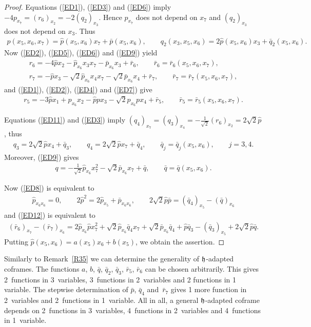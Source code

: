 \documentclass[11pt]{article}
\numberwithin{equation}{section}
\newcommand\fh{{\frak h}}
\begin{document}
\begin{proof}
Equations (\ref{ED1}), (\ref{ED3}) and (\ref{ED6}) imply $-4 p_{x_7}=(r_6)_{x_2}=-2(q_2)_{x_3}$. Hence $p_{x_7}$ does not depend on $x_7$ and $(q_2)_{x_3}$ does not depend on $x_3$. Thus
\begin{gather*}p(x_5,x_6,x_7)=\hat p(x_5,x_6)x_7+\bar p(x_5,x_6), \qquad q_2(x_3,x_5,x_6)=2\hat p(x_5,x_6)x_3 +\bar q_2(x_5,x_6).\end{gather*}
Now (\ref{ED2}), (\ref{ED5}), (\ref{ED6}) and (\ref{ED9}) yield
\begin{gather*}
r_6 = -4 \hat px_2-\hat p_{x_6} x_3 x_7 -\bar p_{x_6} x_3 +\bar r_6,\qquad \bar r_6=\bar r_6(x_5,x_6,x_7),\\
r_7 = -\hat p x_3-\sqrt 2 \hat p_{x_6} x_4x_7-\sqrt 2\bar p_{x_6} x_4 +\bar r_7, \qquad \bar r_7=\bar r_7(x_5,x_6,x_7),
\end{gather*}
and (\ref{ED1}), (\ref{ED2}), (\ref{ED4}) and (\ref{ED7}) give
\begin{gather*} r_5= -3\hat p x_1+p_{x_6}x_2-\hat ppx_3-\sqrt2 p_{x_6}px_4+\bar r_5,\qquad \bar r_5=\bar r_5(x_5,x_6,x_7).\end{gather*}

Equations (\ref{ED11}) and (\ref{ED3}) imply
 $(q_4)_{x_7}=(q_3)_{x_4}=-\frac 1{\sqrt2} (r_6)_{x_2}=2\sqrt 2 \hat p$, thus
\begin{gather*} q_3=2\sqrt 2 \hat px_4+\bar q_3,\qquad q_4=2\sqrt 2 \hat p x_7 +\bar q_4, \qquad \bar q_j=\bar q_j(x_5,x_6),\qquad j=3,4 .\end{gather*}
Moreover, (\ref{ED9}) gives
\begin{gather*}q= -\tfrac1{\sqrt 2} \hat p_{x_6} x_7^2-\sqrt 2 \bar p_{x_6}x_7+\bar q,\qquad \bar q=\bar q(x_5,x_6). \end{gather*}

Now (\ref{ED8}) is equivalent to
\begin{gather*}\hat p_{x_6 x_6}=0,\qquad 2\hat p^2=2\hat p_{x_5}+\bar p_{x_6 x_6}, \qquad
2\sqrt 2\hat p\bar p=(\bar q_4)_{x_5}-(\bar q)_{x_6}\end{gather*}
and (\ref{ED12}) is equivalent to
\begin{gather*}(\bar r_6)_{x_7}-(\bar r_7)_{x_6}=2\hat p_{x_6}\hat px_7^2+\sqrt2\hat p_{x_6}\bar q_4x_7+\sqrt2 \bar p_{x_6} \bar q_4+\hat p\bar q_3-(\bar q_3)_{x_5}+2\sqrt2 \hat p\bar q.\end{gather*}
Putting $\hat p(x_5,x_6)=a(x_5)x_6+b(x_5)$, we obtain the assertion.
\end{proof}
\begin{Remark}\label{R38} Similarly to Remark~\ref{R35} we can determine the generality of $\fh$-adapted coframes. The functions $a$, $b$, $\bar q$, $\bar q_2$, $\bar q_3$, $\bar r_5$, $\bar r_6 $ can be chosen arbitrarily. This gives 2~functions in 3~variables, 3~functions in 2~variables and 2 functions in 1 variable. The stepwise determination of $\bar p$, $\bar q_4$ and~$\bar r_7$ gives 1 more function in 2~variables and 2~functions in 1~variable. All in all, a general $\fh$-adapted coframe depends on 2~functions in 3~variables, 4~functions in 2~variables and 4~functions in 1~variable.
\end{Remark}
\end{document}
